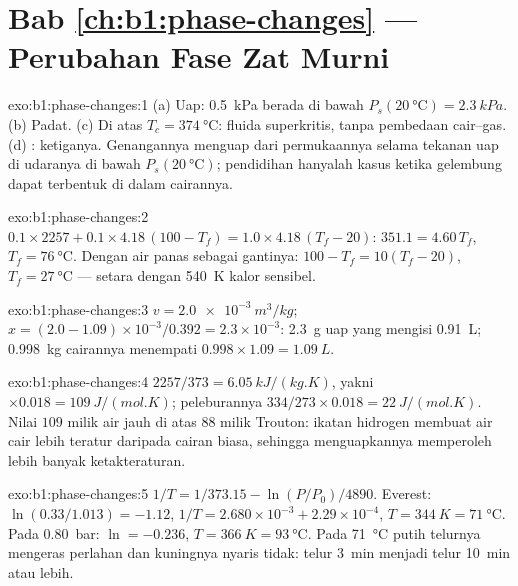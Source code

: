 \section*{Bab \ref{ch:b1:phase-changes} --- Perubahan Fase Zat Murni}

\begin{solution}{exo:b1:phase-changes:1}
(a) Uap: \qty{0.5}{kPa} berada di bawah $P_s(\qty{20}{\degreeCelsius}) = \qty{2.3}{kPa}$.
(b) Padat. (c) Di atas $T_c = \qty{374}{\degreeCelsius}$: fluida superkritis, tanpa
pembedaan cair--gas. (d) : ketiganya. Genangannya
menguap dari permukaannya selama tekanan uap di udaranya
di bawah $P_s(\qty{20}{\degreeCelsius})$; pendidihan hanyalah kasus ketika
gelembung dapat terbentuk di dalam cairannya.
\end{solution}

\begin{solution}{exo:b1:phase-changes:2}
$0.1 \times 2257 + 0.1 \times 4.18\,(100 - T_f) = 1.0 \times 4.18\,(T_f - 20)$:
$351.1 = 4.60\,T_f$, $T_f = \qty{76}{\degreeCelsius}$. Dengan air panas
sebagai gantinya: $100 - T_f = 10(T_f - 20)$, $T_f = \qty{27}{\degreeCelsius}$ ---
 setara dengan \qty{540}{K} kalor sensibel.
\end{solution}

\begin{solution}{exo:b1:phase-changes:3}
$v = \qty{2.0e-3}{m^3/kg}$; $x = (2.0 - 1.09) \times 10^{-3}/0.392 = 2.3 \times 10^{-3}$:
\qty{2.3}{g} uap yang mengisi \qty{0.91}{L}; \qty{0.998}{kg} cairannya
menempati $0.998 \times 1.09 = \qty{1.09}{L}$.
\end{solution}

\begin{solution}{exo:b1:phase-changes:4}
$2257/373 = \qty{6.05}{kJ/(kg.K)}$, yakni $\times 0.018 = \qty{109}{J/(mol.K)}$;
peleburannya $334/273 \times 0.018 = \qty{22}{J/(mol.K)}$. Nilai $109$ milik air jauh
di atas $88$ milik Trouton: ikatan hidrogen membuat air cair lebih teratur
daripada cairan biasa, sehingga menguapkannya memperoleh lebih banyak ketakteraturan.
\end{solution}

\begin{solution}{exo:b1:phase-changes:5}
$1/T = 1/373.15 - \ln(P/P_0)/4890$. Everest: $\ln(0.33/1.013) = -1.12$,
$1/T = 2.680 \times 10^{-3} + 2.29 \times 10^{-4}$, $T = \qty{344}{K} =
\qty{71}{\degreeCelsius}$. Pada \qty{0.80}{bar}: $\ln = -0.236$, $T = \qty{366}{K} =
\qty{93}{\degreeCelsius}$. Pada \qty{71}{\degreeCelsius} putih telurnya mengeras perlahan
dan kuningnya nyaris tidak: telur \qty{3}{min} menjadi telur
\qty{10}{min} atau lebih.
\end{solution}

